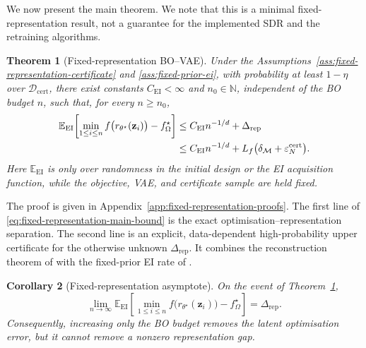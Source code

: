 \documentclass[pdflatex,sn-mathphys-num]{sn-jnl}%
\theoremstyle{thmstyleone}%
\newtheorem{theorem}{Theorem}%
\newtheorem{corollary}[theorem]{Corollary}
\theoremstyle{thmstyletwo}%
\theoremstyle{thmstylethree}%
\begin{document}
We now present the main theorem. We note that this is a minimal fixed-representation result, not a guarantee for the implemented SDR and the retraining algorithms.

\begin{theorem}[Fixed-representation BO--VAE]
\label{thm:fixed-representation-bovae}
Under the Assumptions~\ref{ass:fixed-representation-certificate} and \ref{ass:fixed-prior-ei}, with probability at least $1-\eta$ over $\mathcal{D}_{\mathrm{cert}}$, there exist constants $C_{\mathrm{EI}}<\infty$ and $n_0\in\mathbb{N}$, independent of the BO budget $n$, such that, for every $n\geq n_0$,
\begin{align}
  \mathbb{E}_{\mathrm{EI}}\!\left[
    \min_{1\leq i\leq n}f\bigl(r_{\theta^\star}(\mathbf{z}_i)\bigr)
    -f_\Omega^\star
  \right]
  &\leq C_{\mathrm{EI}}n^{-1/d}
       +\Delta_{\mathrm{rep}}
  \notag\\
  &\leq C_{\mathrm{EI}}n^{-1/d}
       +L_f\bigl(\delta_{\mathcal{M}}
                  +\varepsilon_N^{\mathrm{cert}}\bigr).
  \label{eq:fixed-representation-main-bound}
\end{align}
Here $\mathbb{E}_{\mathrm{EI}}$ is only over randomness in the initial design or the EI acquisition function, while the objective, VAE, and certificate sample are held fixed.
\end{theorem}

The proof is given in Appendix~\ref{app:fixed-representation-proofs}. The first line of \eqref{eq:fixed-representation-main-bound} is the exact
optimisation--representation separation.  The second line is an explicit, data-dependent high-probability upper certificate for the otherwise unknown $\Delta_{\mathrm{rep}}$.  It combines the reconstruction theorem of \cite{mbacke2023statisticalguaranteesvariationalautoencoders} with the fixed-prior EI rate of \cite{bull2011ego}. 

\begin{corollary}[Fixed-representation asymptote]
\label{cor:fixed-representation-floor}
On the event of Theorem~\ref{thm:fixed-representation-bovae},
\begin{equation}
  \lim_{n\to\infty}
  \mathbb{E}_{\mathrm{EI}}\!\left[
    \min_{1\leq i\leq n}f\bigl(r_{\theta^\star}(\mathbf{z}_i)\bigr)
    -f_\Omega^\star
  \right]
  =\Delta_{\mathrm{rep}}.
  \label{eq:fixed-representation-asymptote}
\end{equation}
Consequently, increasing only the BO budget removes the latent optimisation error, but it cannot remove a nonzero representation gap.
\end{corollary}
\end{document}
